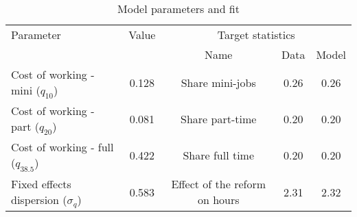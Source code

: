 \begin{table}[htbp]\caption{Model parameters and fit}\label{table:model_param}\centering\footnotesize\begin{tabular}{lcccc} \toprule  Parameter & Value & \multicolumn{3}{c}{Target statistics}  \\\cline{3-5}  &  &  Name & Data & Model  \\\midrule    Cost of working - mini ($q_{10}$)   &0.128& Share mini-jobs           & 0.26 &0.26\\ Cost of working - part ($q_{20}$)   &0.081& Share part-time           & 0.20 &0.20\\ Cost of working - full ($q_{38.5}$)      &0.422& Share full time      & 0.20 &0.20\\ Fixed effects dispersion ($\sigma_q$)   &0.583& Effect of the reform on hours  & 2.31 & 2.32\\  \bottomrule\end{tabular}\end{table}